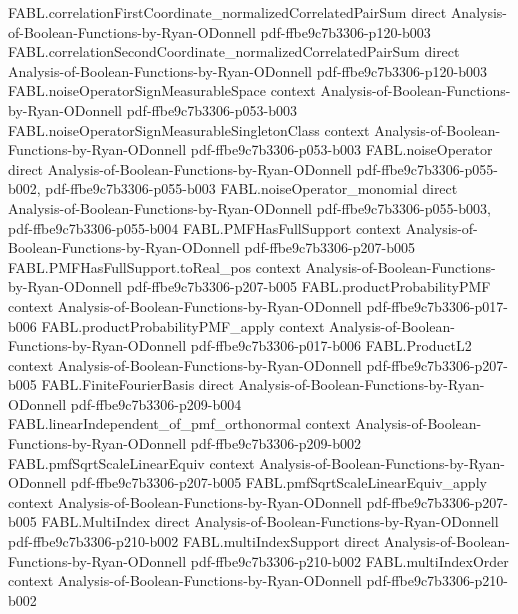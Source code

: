 \begin{theorem}
\proofstep
  {FABL.correlationFirstCoordinate_normalizedCorrelatedPairSum}
  {direct}
  {Analysis-of-Boolean-Functions-by-Ryan-ODonnell}
  {pdf-ffbe9c7b3306-p120-b003}
\proofstep
  {FABL.correlationSecondCoordinate_normalizedCorrelatedPairSum}
  {direct}
  {Analysis-of-Boolean-Functions-by-Ryan-ODonnell}
  {pdf-ffbe9c7b3306-p120-b003}
\proofstep
  {FABL.noiseOperatorSignMeasurableSpace}
  {context}
  {Analysis-of-Boolean-Functions-by-Ryan-ODonnell}
  {pdf-ffbe9c7b3306-p053-b003}
\proofstep
  {FABL.noiseOperatorSignMeasurableSingletonClass}
  {context}
  {Analysis-of-Boolean-Functions-by-Ryan-ODonnell}
  {pdf-ffbe9c7b3306-p053-b003}
\proofstep
  {FABL.noiseOperator}
  {direct}
  {Analysis-of-Boolean-Functions-by-Ryan-ODonnell}
  {pdf-ffbe9c7b3306-p055-b002,
    pdf-ffbe9c7b3306-p055-b003}
\proofstep
  {FABL.noiseOperator_monomial}
  {direct}
  {Analysis-of-Boolean-Functions-by-Ryan-ODonnell}
  {pdf-ffbe9c7b3306-p055-b003,
    pdf-ffbe9c7b3306-p055-b004}
\proofstep
  {FABL.PMFHasFullSupport}
  {context}
  {Analysis-of-Boolean-Functions-by-Ryan-ODonnell}
  {pdf-ffbe9c7b3306-p207-b005}
\proofstep
  {FABL.PMFHasFullSupport.toReal_pos}
  {context}
  {Analysis-of-Boolean-Functions-by-Ryan-ODonnell}
  {pdf-ffbe9c7b3306-p207-b005}
\proofstep
  {FABL.productProbabilityPMF}
  {context}
  {Analysis-of-Boolean-Functions-by-Ryan-ODonnell}
  {pdf-ffbe9c7b3306-p017-b006}
\proofstep
  {FABL.productProbabilityPMF_apply}
  {context}
  {Analysis-of-Boolean-Functions-by-Ryan-ODonnell}
  {pdf-ffbe9c7b3306-p017-b006}
\proofstep
  {FABL.ProductL2}
  {context}
  {Analysis-of-Boolean-Functions-by-Ryan-ODonnell}
  {pdf-ffbe9c7b3306-p207-b005}
\proofstep
  {FABL.FiniteFourierBasis}
  {direct}
  {Analysis-of-Boolean-Functions-by-Ryan-ODonnell}
  {pdf-ffbe9c7b3306-p209-b004}
\proofstep
  {FABL.linearIndependent_of_pmf_orthonormal}
  {context}
  {Analysis-of-Boolean-Functions-by-Ryan-ODonnell}
  {pdf-ffbe9c7b3306-p209-b002}
\proofstep
  {FABL.pmfSqrtScaleLinearEquiv}
  {context}
  {Analysis-of-Boolean-Functions-by-Ryan-ODonnell}
  {pdf-ffbe9c7b3306-p207-b005}
\proofstep
  {FABL.pmfSqrtScaleLinearEquiv_apply}
  {context}
  {Analysis-of-Boolean-Functions-by-Ryan-ODonnell}
  {pdf-ffbe9c7b3306-p207-b005}
\proofstep
  {FABL.MultiIndex}
  {direct}
  {Analysis-of-Boolean-Functions-by-Ryan-ODonnell}
  {pdf-ffbe9c7b3306-p210-b002}
\proofstep
  {FABL.multiIndexSupport}
  {direct}
  {Analysis-of-Boolean-Functions-by-Ryan-ODonnell}
  {pdf-ffbe9c7b3306-p210-b002}
\proofstep
  {FABL.multiIndexOrder}
  {context}
  {Analysis-of-Boolean-Functions-by-Ryan-ODonnell}
  {pdf-ffbe9c7b3306-p210-b002}
\proofstep

\end{theorem}
